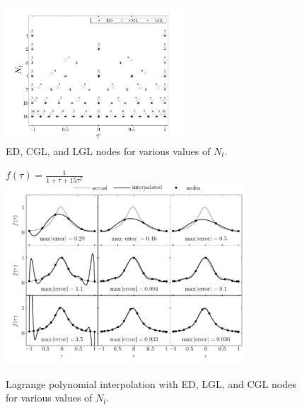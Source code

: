 \begin{figure}
\centering
\includegraphics[width=0.6\textwidth]{../app3/figures/nodes}
\caption[ED, CGL, and LGL nodes for various values of $N_t$]{ED, CGL, and LGL nodes for various values of $N_t$. \label{fig:nodes}}
\end{figure}

\begin{figure}
\centering
{\large$f(\tau) = \frac{1}{1 + \tau + 15\tau^2}$}\\
\includegraphics[width=0.8\textwidth]{../app3/figures/approx}
\caption[Lagrange polynomial interpolation with ED, LGL, and CGL
nodes]{Lagrange polynomial interpolation with ED, LGL, and CGL
nodes for various values of $N_t$. \label{fig:approx}}
\end{figure}

